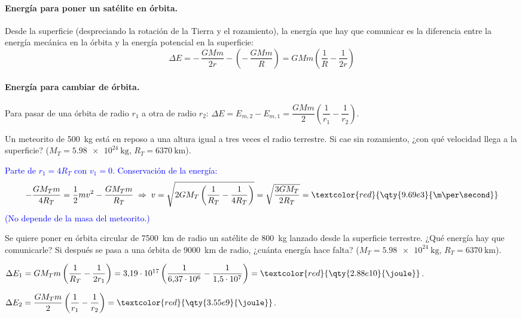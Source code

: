 \paragraph{Energía para poner un satélite en órbita.} Desde la superficie (despreciando la rotación de la Tierra y el
rozamiento), la energía que hay que comunicar es la diferencia entre la energía mecánica en la órbita y la energía potencial
en la superficie:
\begin{equation*}
    \Delta E = -\,\dfrac{G M m}{2r} - \left(-\,\dfrac{G M m}{R}\right) = G M m\left(\dfrac{1}{R} - \dfrac{1}{2r}\right)
\end{equation*}

\paragraph{Energía para cambiar de órbita.} Para pasar de una órbita de radio \(r_1\) a otra de radio \(r_2\):
\(\Delta E = E_{m,2} - E_{m,1} = \dfrac{G M m}{2}\left(\dfrac{1}{r_1} - \dfrac{1}{r_2}\right)\).

\begin{exercise}
    Un meteorito de \qty{500}{\kg} está en reposo a una altura igual a tres veces el radio terrestre. Si cae sin rozamiento,
    ¿con qué velocidad llega a la superficie? (\(M_T = \qty{5.98e24}{\kg}\), \(R_T = \qty{6370}{\km}\)).
    \begin{solu}
        \textcolor{blue}{Parte de \(r_1 = 4R_T\) con \(v_1 = 0\). Conservación de la energía:}
        \[ -\dfrac{G M_T m}{4R_T} = \dfrac{1}{2}m v^2 - \dfrac{G M_T m}{R_T} \;\Rightarrow\; v = \sqrt{2 G M_T\left(\dfrac{1}{R_T} - \dfrac{1}{4R_T}\right)} = \sqrt{\dfrac{3 G M_T}{2 R_T}} = \textcolor{red}{\qty{9.69e3}{\m\per\second}} \]
        \textcolor{blue}{(No depende de la masa del meteorito.)}
    \end{solu}
\end{exercise}

\begin{exercise}
    Se quiere poner en órbita circular de \qty{7500}{\km} de radio un satélite de \qty{800}{\kg} lanzado desde la superficie
    terrestre. ¿Qué energía hay que comunicarle? Si después se pasa a una órbita de \qty{9000}{\km} de radio, ¿cuánta energía
    hace falta? (\(M_T = \qty{5.98e24}{\kg}\), \(R_T = \qty{6370}{\km}\)).
    \begin{solu}
        \(\Delta E_1 = G M_T m\left(\dfrac{1}{R_T} - \dfrac{1}{2r_1}\right) = 3{,}19\cdot 10^{17}\left(\dfrac{1}{6{,}37\cdot 10^6} - \dfrac{1}{1{,}5\cdot 10^7}\right) = \textcolor{red}{\qty{2.88e10}{\joule}}\).

        \(\Delta E_2 = \dfrac{G M_T m}{2}\left(\dfrac{1}{r_1} - \dfrac{1}{r_2}\right) = \textcolor{red}{\qty{3.55e9}{\joule}}\).
    \end{solu}
\end{exercise}

